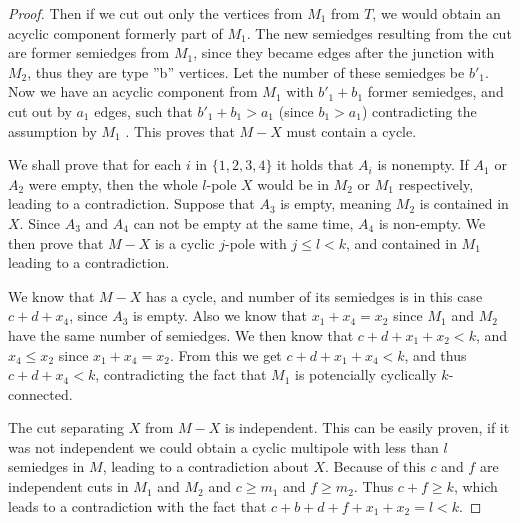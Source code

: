 \documentclass[12pt, twoside]{book}
\begin{document}
\begin{proof}
	Then if we cut out only the vertices from $M_1$ from $T$, we would obtain an acyclic component formerly part of $M_1$. The new semiedges resulting from the cut are former semiedges from $M_1$, since they became edges after the junction with $M_2$, thus they are type ''b'' vertices. Let the number of these semiedges be $b'_1$. Now we have an acyclic component from $M_1$ with $b'_1+b_1$ former semiedges, and cut out by $a_1$ edges, such that $b'_1+b_1>a_1$ (since $b_1>a_1$) contradicting the assumption by $M_1$ . This proves that $M-X$ must contain a cycle.
	
	We shall prove that for each $i$ in $\{1,2,3,4\}$ it holds that $A_i$ is nonempty. If $A_1$ or $A_2$ were empty, then the whole $l$-pole $X$ would be in $M_2$ or $M_1$ respectively, leading to a contradiction. Suppose that $A_3$ is empty, meaning $M_2$ is contained in $X$. Since $A_3$ and $A_4$ can not be empty at the same time, $A_4$ is non-empty. We then prove that $M-X$ is a cyclic $j$-pole with $j\leq l < k$, and contained in $M_1$ leading to a contradiction. 
	
	We know that $M-X$ has a cycle, and number of its semiedges is in this case $c+d+x_4$, since $A_3$ is empty. Also we know that $x_1+x_4=x_2$ since $M_1$ and $M_2$ have the same number of semiedges. We then know that $c+d+x_1+x_2<k$, and $x_4\leq x_2$ since $x_1+x_4=x_2$. From this we get $c+d+x_1+x_4<k$, and thus $c+d+x_4<k$, contradicting the fact that $M_1$ is potencially cyclically $k$-connected.
	
	
	The cut separating $X$ from $M-X$ is independent. This can be easily proven, if it was not independent we could obtain a cyclic multipole with less than $l$ semiedges in $M$, leading to a contradiction about $X$. Because of this $c$ and $f$ are independent cuts in $M_1$ and $M_2$ and $c\geq m_1$ and $f\geq m_2$. Thus $c+f\geq k$, which leads to a contradiction with the fact that $c+b+d+f+x_1+x_2=l<k$.
\end{proof}
\end{document}
